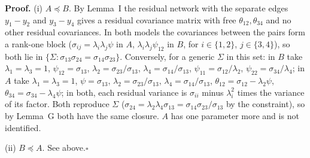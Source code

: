 \documentclass[10pt,a4paper]{article}
\newcommand{\nest}{\preceq}
\begin{document}
\noindent\textbf{Proof.} (i) $A\nest B$. By Lemma~I the residual network with the separate edges $y_1-y_2$ and $y_3-y_4$ gives a residual covariance matrix with free $\theta_{12},\theta_{34}$ and no other residual covariances. In both models the covariances between the pairs form a rank-one block ($\sigma_{ij}=\lambda_i\lambda_j\psi$ in $A$, $\lambda_i\lambda_j\psi_{12}$ in $B$, for $i\in\{1,2\}$, $j\in\{3,4\}$), so both lie in $\{\Sigma:\sigma_{13}\sigma_{24}=\sigma_{14}\sigma_{23}\}$. Conversely, for a generic $\Sigma$ in this set: in $B$ take $\lambda_1=\lambda_3=1$, $\psi_{12}=\sigma_{13}$, $\lambda_2=\sigma_{23}/\sigma_{13}$, $\lambda_4=\sigma_{14}/\sigma_{13}$, $\psi_{11}=\sigma_{12}/\lambda_2$, $\psi_{22}=\sigma_{34}/\lambda_4$; in $A$ take $\lambda_1=\lambda_3=1$, $\psi=\sigma_{13}$, $\lambda_2=\sigma_{23}/\sigma_{13}$, $\lambda_4=\sigma_{14}/\sigma_{13}$, $\theta_{12}=\sigma_{12}-\lambda_2\psi$, $\theta_{34}=\sigma_{34}-\lambda_4\psi$; in both, each residual variance is $\sigma_{ii}$ minus $\lambda_i^2$ times the variance of its factor. Both reproduce $\Sigma$ ($\sigma_{24}=\lambda_2\lambda_4\sigma_{13}=\sigma_{14}\sigma_{23}/\sigma_{13}$ by the constraint), so by Lemma~G both have the same closure. $A$ has one parameter more and is not identified.\par\smallskip
\noindent(ii) $B\nest A$. See above.\hfill$\square$\par\medskip
{}

\clearpage
\end{document}
